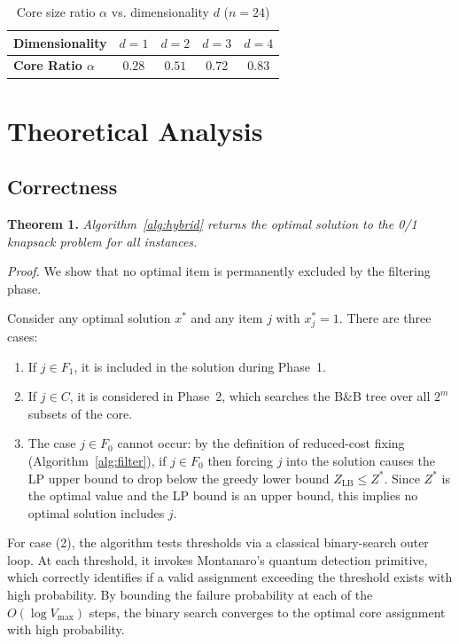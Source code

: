 \documentclass[conference]{IEEEtran} \IEEEoverridecommandlockouts
\begin{document}
\begin{table}[htbp]
\caption{Core size ratio $\alpha$ vs. dimensionality $d$ ($n=24$)}
\label{tab:multidim}
\begin{center}
\begin{tabular}{lcccc}
\toprule
\textbf{Dimensionality} & $d=1$ & $d=2$ & $d=3$ & $d=4$ \\
\midrule
\textbf{Core Ratio $\alpha$} & $0.28$ & $0.51$ & $0.72$ & $0.83$ \\
\bottomrule
\end{tabular}
\end{center}
\end{table}

\section{Theoretical Analysis}

\subsection{Correctness}

\textbf{Theorem 1.} \textit{Algorithm~\ref{alg:hybrid} returns the optimal solution to the 0/1 knapsack problem for all instances.}

\textit{Proof.} We show that no optimal item is permanently excluded by the filtering phase.

Consider any optimal solution $x^*$ and any item $j$ with $x_j^* = 1$. There are three cases:
\begin{enumerate}
    \item If $j \in F_1$, it is included in the solution during Phase~1.
    \item If $j \in C$, it is considered in Phase~2, which searches the B\&B tree over all $2^m$ subsets of the core.
    \item The case $j \in F_0$ cannot occur: by the definition of reduced-cost fixing (Algorithm~\ref{alg:filter}), if $j \in F_0$ then forcing $j$ into the solution causes the LP upper bound to drop below the greedy lower bound $Z_{\text{LB}} \leq Z^*$. Since $Z^*$ is the optimal value and the LP bound is an upper bound, this implies no optimal solution includes $j$.
\end{enumerate}

For case (2), the algorithm tests thresholds via a classical binary-search outer loop. At each threshold, it invokes Montanaro's quantum detection primitive, which correctly identifies if a valid assignment exceeding the threshold exists with high probability. By bounding the failure probability at each of the $O(\log V_{\max})$ steps, the binary search converges to the optimal core assignment with high probability.
\end{document}
